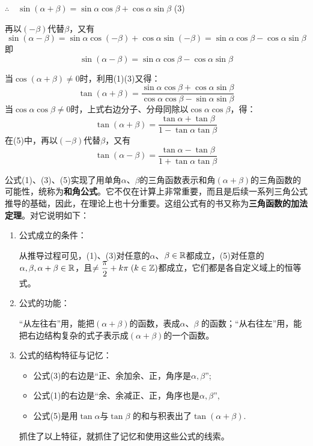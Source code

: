 $\therefore\quad \sin(\alpha+\beta)=\sin\alpha\cos\beta+\cos\alpha\sin\beta$ \hfill(3)

再以$(-\beta)$代替$\beta$，又有
\[\sin(\alpha-\beta)=\sin\alpha\cos(-\beta)+\cos\alpha\sin(-\beta)=\sin\alpha\cos\beta-\cos\alpha\sin\beta\]
即
\begin{equation}
    \sin(\alpha-\beta)=\sin\alpha\cos\beta-\cos\alpha\sin\beta \tag{4}
\end{equation}

当$\cos(\alpha+\beta)\ne 0$时，利用(1)(3)又得：
\[\tan(\alpha+\beta)=\frac{\sin\alpha\cos\beta+\cos\alpha\sin\beta}{\cos\alpha\cos\beta-\sin\alpha\sin\beta}\]
当$\cos\alpha\cos\beta\ne 0$时，上式右边分子、分母同除以$\cos\alpha\cos\beta$，得：
\begin{equation}
    \tan(\alpha+\beta)=\frac{\tan\alpha+\tan\beta}{1-\tan\alpha\tan\beta}\tag{5}
\end{equation}
在(5)中，再以$(-\beta)$代替$\beta$，又有
\begin{equation}
    \tan(\alpha-\beta)=\frac{\tan\alpha-\tan\beta}{1+\tan\alpha\tan\beta}\tag{6}
\end{equation}

公式(1)、(3)、(5)实现了用单角$\alpha$、$\beta$的三角函数表示和角$(\alpha+\beta)$的三角函数的可能性，统称为\textbf{和角公式}。它不仅在计算上非常重要，而且是后续一系列三角公式推导的基础，因此，在理论上也十分重要。这组公式有的书又称为\textbf{三角函数的加法定理}。对它说明如下：

\begin{enumerate}
    \item 公式成立的条件：
    
    从推导过程可见，(1)、(3)对任意的$\alpha$、$\beta\in \mathbb{R}$都成立，(5)对任意的$\alpha,\beta,\alpha+\beta\in\mathbb{R}$，且$\ne \dfrac{\pi}{2}+k\pi\;(k\in\mathbb{Z})$都成立，它们都是各自定义域上的恒等式。

\item 公式的功能：

    “从左往右”用，能把$(\alpha+\beta )$的函数，表成$\alpha$、$\beta$ 的函数；“从右往左”用，能把右边结构复杂的式子表示成$(\alpha+\beta )$的一个函数。
\item 公式的结构特征与记忆：
\begin{itemize}
    \item 公式(3)的右边是“正、余加余、正，角序是$\alpha,\beta$”;
    \item 公式(1)的右边是“余、余减正、正，角序也是$\alpha, \beta$”,
    \item 公式(5)是用$\tan\alpha$与$\tan\beta$ 的和与积表出了$\tan(\alpha+\beta)$.
\end{itemize}
    
    抓住了以上特征，就抓住了记忆和使用这些公式的线索。
\end{enumerate}    

